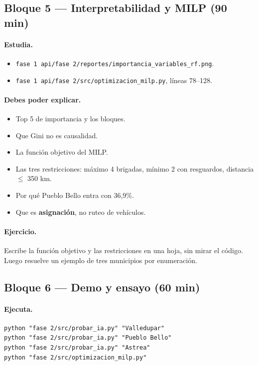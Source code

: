 \documentclass[11pt,a4paper]{article}
\newcommand{\code}[1]{\texttt{#1}}
\begin{document}
\subsection{Bloque 5 --- Interpretabilidad y MILP (90 min)}

\paragraph{Estudia.}
\begin{itemize}[leftmargin=*]
  \item \code{fase 1 api/fase 2/reportes/importancia_variables_rf.png}.
  \item \code{fase 1 api/fase 2/src/optimizacion_milp.py}, líneas 78--128.
\end{itemize}

\paragraph{Debes poder explicar.}
\begin{itemize}[leftmargin=*]
  \item Top 5 de importancia y los bloques.
  \item Que Gini no es causalidad.
  \item La función objetivo del MILP.
  \item Las tres restricciones: máximo 4 brigadas, mínimo 2 con resguardos, distancia $\le$ 350 km.
  \item Por qué Pueblo Bello entra con 36,9\%.
  \item Que es \textbf{asignación}, no ruteo de vehículos.
\end{itemize}

\paragraph{Ejercicio.}
Escribe la función objetivo y las restricciones en una hoja, sin mirar el código. Luego resuelve un ejemplo de tres municipios por enumeración.

\subsection{Bloque 6 --- Demo y ensayo (60 min)}

\paragraph{Ejecuta.}
\begin{verbatim}
python "fase 2/src/probar_ia.py" "Valledupar"
python "fase 2/src/probar_ia.py" "Pueblo Bello"
python "fase 2/src/probar_ia.py" "Astrea"
python "fase 2/src/optimizacion_milp.py"
\end{verbatim}
\end{document}
